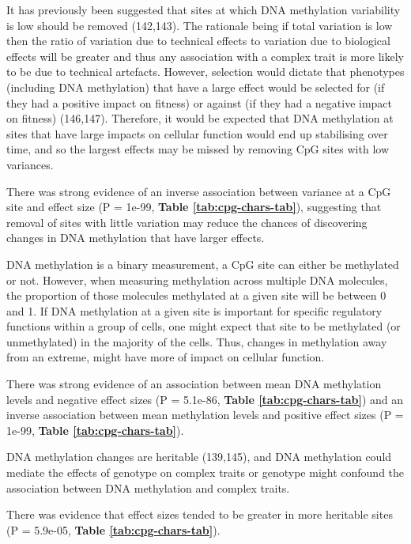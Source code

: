 \documentclass[11pt,oneside]{bristolthesis}
\begin{document}
It has previously been suggested that sites at which DNA methylation variability is low should be removed (142,143). The rationale being if total variation is low then the ratio of variation due to technical effects to variation due to biological effects will be greater and thus any association with a complex trait is more likely to be due to technical artefacts. However, selection would dictate that phenotypes (including DNA methylation) that have a large effect would be selected for (if they had a positive impact on fitness) or against (if they had a negative impact on fitness) (146,147). Therefore, it would be expected that DNA methylation at sites that have large impacts on cellular function would end up stabilising over time, and so the largest effects may be missed by removing CpG sites with low variances.

There was strong evidence of an inverse association between variance at a CpG site and effect size (P = 1e-99, \textbf{Table \ref{tab:cpg-chars-tab}}), suggesting that removal of sites with little variation may reduce the chances of discovering changes in DNA methylation that have larger effects.

DNA methylation is a binary measurement, a CpG site can either be methylated or not. However, when measuring methylation across multiple DNA molecules, the proportion of those molecules methylated at a given site will be between 0 and 1. If DNA methylation at a given site is important for specific regulatory functions within a group of cells, one might expect that site to be methylated (or unmethylated) in the majority of the cells. Thus, changes in methylation away from an extreme, might have more of impact on cellular function.

There was strong evidence of an association between mean DNA methylation levels and negative effect sizes (P = 5.1e-86, \textbf{Table \ref{tab:cpg-chars-tab}}) and an inverse association between mean methylation levels and positive effect sizes (P = 1e-99, \textbf{Table \ref{tab:cpg-chars-tab}}).

DNA methylation changes are heritable (139,145), and DNA methylation could mediate the effects of genotype on complex traits or genotype might confound the association between DNA methylation and complex traits.

There was evidence that effect sizes tended to be greater in more heritable sites (P = 5.9e-05, \textbf{Table \ref{tab:cpg-chars-tab}}).
\end{document}
